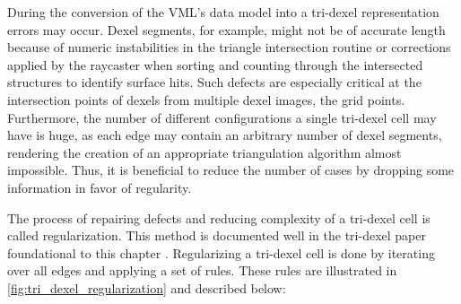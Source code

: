 During the conversion of the VML's data model into a tri-dexel representation errors may occur.
Dexel segments, for example, might not be of accurate length because of numeric instabilities in the triangle intersection routine or corrections applied by the raycaster when sorting and counting through the intersected structures to identify surface hits.
Such defects are especially critical at the intersection points of dexels from multiple dexel images, the grid points.
Furthermore, the number of different configurations a single tri-dexel cell may have is huge, as each edge may contain an arbitrary number of dexel segments, rendering the creation of an appropriate triangulation algorithm almost impossible.
Thus, it is beneficial to reduce the number of cases by dropping some information in favor of regularity.

The process of repairing defects and reducing complexity of a tri-dexel cell is called regularization.
This method is documented well in the tri-dexel paper foundational to this chapter \cite{tridexel_reconstruction}.
Regularizing a tri-dexel cell is done by iterating over all edges and applying a set of rules.
These rules are illustrated in \cref{fig:tri_dexel_regularization} and described below:

